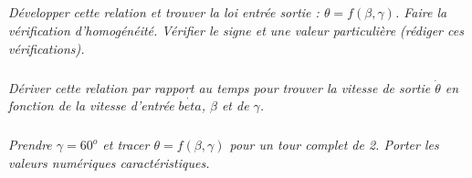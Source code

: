 \documentclass[10pt,fleqn]{article} %
\begin{document}
\begin{multicols}{2}
\subparagraph{}
\textit{Développer cette relation et trouver la loi entrée sortie : $\theta = f(\beta , \gamma)$. Faire la vérification d'homogénéité. Vérifier le signe et une valeur particulière (rédiger ces vérifications).}

\subparagraph{}
\textit{Dériver cette relation par rapport au temps pour trouver la vitesse de sortie $\dot{\theta}$ en fonction de la vitesse d'entrée $\dot{beta}$,  $\beta$  et de $\gamma$.}

\subparagraph{}
\textit{Prendre  $\gamma = 60^o$ et tracer $\theta = f(\beta, \gamma)$ pour un tour complet de 2. Porter les valeurs numériques caractéristiques.}
\end{multicols}
\end{document}
